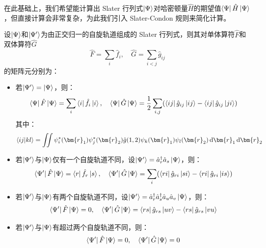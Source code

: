 在此基础上，我们希望能计算出 Slater 行列式$\ket{\Psi}$对哈密顿量$\hat{H}$的期望值$\bra{\Psi}\hat{H}\ket{\Psi}$，但直接计算会非常复杂，为此我们引入 Slater-Condon 规则来简化计算。
\begin{theorem}\label{slater-condon}
设$\ket{\Psi}$和$\ket{\Psi'}$为由正交归一的自旋轨道组成的 Slater 行列式，则其对单体算符$\hat{F}$和双体算符$\hat{G}$
\[\hat{F}=\sum_i\hat{f}_i, \quad \hat{G}=\sum_{i<j}\hat{g}_{ij}\]
的矩阵元分别为：
\begin{itemize}
\item 若$\ket{\Psi'}=\ket{\Psi}$，则：
\[\bra{\Psi}\hat{F}\ket{\Psi}=\sum_i\bra{i}\hat{f}_i\ket{i}, \quad \bra{\Psi}\hat{G}\ket{\Psi}=\frac{1}{2}\sum_{i,j}(\bra{ij}\hat{g}_{ij}\ket{ij}-\bra{ij}\hat{g}_{ij}\ket{ji})\]
其中：
\[\bra{ij}\ket{kl}=\iint \psi_i^*(\bm{r}_1)\psi_j^*(\bm{r}_2)\hat{g}(1,2)\psi_k(\bm{r}_1)\psi_l(\bm{r}_2)\dd{\bm{r}_1}\dd{\bm{r}_2}\]
\item 若$\ket{\Psi'}$与$\ket{\Psi}$仅有一个自旋轨道不同，设$\ket{\Psi'}=\hat{a}_r^{\dagger}\hat{a}_s\ket{\Psi}$，则：
\[\bra{\Psi'}\hat{F}\ket{\Psi}=\bra{r}\hat{f}_r\ket{s}, \quad \bra{\Psi'}\hat{G}\ket{\Psi}=\sum_{i}(\bra{ri}\hat{g}_{ri}\ket{si}-\bra{ri}\hat{g}_{ri}\ket{is})\]
\item 若$\ket{\Psi'}$与$\ket{\Psi}$有两个自旋轨道不同，设$\ket{\Psi'}=\hat{a}_r^{\dagger}\hat{a}_s^{\dagger}\hat{a}_u\hat{a}_v\ket{\Psi}$，则：
\[\bra{\Psi'}\hat{F}\ket{\Psi}=0, \quad \bra{\Psi'}\hat{G}\ket{\Psi}=\bra{rs}\hat{g}_{rs}\ket{uv}-\bra{rs}\hat{g}_{rs}\ket{vu}\]
\item 若$\ket{\Psi'}$与$\ket{\Psi}$有超过两个自旋轨道不同，则：
\[\bra{\Psi'}\hat{F}\ket{\Psi}=0, \quad \bra{\Psi'}\hat{G}\ket{\Psi}=0\]
\end{itemize}
\end{theorem}
